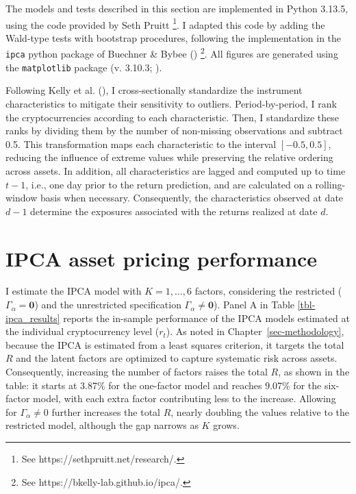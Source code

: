 \documentclass[
  12pt,
  a4paper,
  openany]{scrbook}
\begin{document}
The models and tests described in this section are implemented in Python
3.13.5, using the code provided by Seth Pruitt \footnote{See
  https://sethpruitt.net/research/.}. I adapted this code by adding the
Wald-type tests with bootstrap procedures, following the implementation
in the \texttt{ipca} python package of Buechner \& Bybee
() \footnote{See
  https://bkelly-lab.github.io/ipca/.}. All figures are generated using
the \texttt{matplotlib} package (v. 3.10.3;
).

Following Kelly et al.
(), I cross-sectionally
standardize the instrument characteristics to mitigate their sensitivity
to outliers. Period-by-period, I rank the cryptocurrencies according to
each characteristic. Then, I standardize these ranks by dividing them by
the number of non-missing observations and subtract 0.5. This
transformation maps each characteristic to the interval \([-0.5, 0.5]\),
reducing the influence of extreme values while preserving the relative
ordering across assets. In addition, all characteristics are lagged and
computed up to time \(t-1\), i.e., one day prior to the return
prediction, and are calculated on a rolling-window basis when necessary.
Consequently, the characteristics observed at date \(d-1\) determine the
exposures associated with the returns realized at date \(d\).

\section{IPCA asset pricing
performance}\label{ipca-asset-pricing-performance}

I estimate the IPCA model with \(K = 1, \dots, 6\) factors, considering
the restricted (\(\Gamma_\alpha = \mathbf{0}\)) and the unrestricted
specification \(\Gamma_\alpha \neq \mathbf{0}\)). Panel A in Table
\ref{tbl-ipca_results} reports the in-sample performance of the IPCA
models estimated at the individual cryptocurrency level (\(r_t\)). As
noted in Chapter~\ref{sec-methodology}, because the IPCA is estimated
from a least squares criterion, it targets the total \(R\) and the
latent factors are optimized to capture systematic risk across assets.
Consequently, increasing the number of factors raises the total \(R\),
as shown in the table: it starts at 3.87\% for the one-factor model and
reaches 9.07\% for the six-factor model, with each extra factor
contributing less to the increase. Allowing for \(\Gamma_\alpha \neq 0\)
further increases the total \(R\), nearly doubling the values relative
to the restricted model, although the gap narrows as \(K\) grows.
\end{document}
